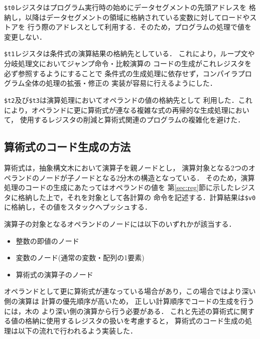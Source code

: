 \verb|$t0|レジスタはプログラム実行時の始めにデータセグメントの先頭アドレスを
格納し，以降はデータセグメントの領域に格納されている変数に対してロードやストアを
行う際のアドレスとして利用する．そのため，プログラムの処理で値を変更しない．

\verb|$t1|レジスタは条件式の演算結果の格納先としている．
これにより，ループ文や分岐処理文においてジャンプ命令・比較演算の
コードの生成がこれレジスタを必ず参照するようにすることで
条件式の生成処理に依存せず，コンパイラプログラム全体の処理の拡張・修正の
実装が容易に行えるようにした．

\verb|$t2|及び\verb|$t3|は演算処理においてオペランドの値の格納先として
利用した．これにより，オペランドに更に算術式が連なる複雑な式の再帰的な生成処理において，
使用するレジスタの削減と算術式関連のプログラムの複雑化を避けた．

\subsection{算術式のコード生成の方法} \label{sec:expresssion}
算術式は，抽象構文木において演算子を親ノードとし，
演算対象となる2つのオペランドのノードが子ノードとなる2分木の構造となっている．
そのため，演算処理のコードの生成にあたってはオペランドの値を
第\ref{sec:reg}節に示したレジスタに格納した上で，それを対象として各計算の
命令を記述する．計算結果は\verb|$v0|に格納し，その値をスタックへプッシュする．

演算子の対象となるオペランドのノードには以下のいずれかが該当する．
\begin{itemize}
  \item 整数の即値のノード
  \item 変数のノード(通常の変数・配列の1要素)
  \item 算術式の演算子のノード
\end{itemize}
オペランドとして更に算術式が連なっている場合があり，この場合ではより深い側の演算は
計算の優先順序が高いため，
正しい計算順序でコードの生成を行うには，木の
より深い側の演算から行う必要がある．
これと先述の算術式に関する値の格納に使用するレジスタの扱いを考慮すると，
算術式のコード生成の処理は以下の流れで行われるよう実装した．

